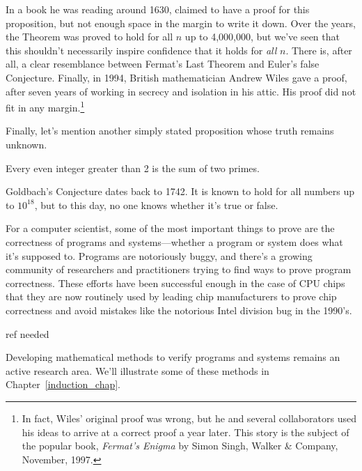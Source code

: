 In a book he was reading around 1630,  claimed to have a
proof for this proposition, but not enough space in the margin to
write it down.  Over the years, the Theorem was proved to hold for all
$n$ up to 4,000,000, but we've seen that this shouldn't necessarily
inspire confidence that it holds for \emph{all} $n$.  There is, after
all, a clear resemblance between Fermat's Last Theorem and Euler's
false Conjecture.  Finally, in 1994, British mathematician Andrew
Wiles gave a proof, after seven years of working in secrecy and
isolation in his attic.  His proof did not fit in any
margin.\footnote{In fact, Wiles' original proof was wrong, but he and
  several collaborators used his ideas to arrive at a correct proof a
  year later.  This story is the subject of the popular book,
  \emph{Fermat's Enigma} by Simon Singh, Walker \& Company, November,
  1997.}

Finally, let's mention another simply stated proposition whose truth
remains unknown.

\begin{proposition}\label{Goldbach}
Every even integer greater than 2 is the sum of two primes.
\end{proposition}

Goldbach's Conjecture dates back to 1742.  It is known to hold for all
numbers up to $10^{18}$, but to this day, no one knows whether it's
true or false.

\vspace{0.3in}
For a computer scientist, some of the most important things to prove are
the correctness of programs and systems---whether a program or system
does what it's supposed to.  Programs are notoriously buggy, and there's a
growing community of researchers and practitioners trying to find ways to
prove program correctness.  These efforts have been successful enough in
the case of CPU chips that they are now routinely used by leading chip
manufacturers to prove chip correctness and avoid mistakes like the
notorious Intel division bug in the 1990's.
\begin{editingnotes}
ref needed
\end{editingnotes}

Developing mathematical methods to verify programs and systems remains
an active research area.  We'll illustrate some of these methods in
Chapter~\ref{induction_chap}.

\begin{problems}
\classproblems
{}
\end{problems}

